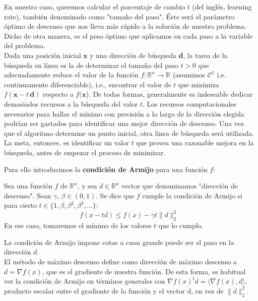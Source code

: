 En nuestro caso, queremos calcular el porcentaje de cambio $t$ (del inglés, learning rate), también denominado como "tamaño del paso". Éste será el parámetro óptimo de descenso que nos lleva más rápido a la solución de nuestro problema. Dicho de otra manera, es el peso óptimo que aplicamos en cada paso a la variable del problema.\\

Dada una posición inicial $\mathbf {x}$ y una dirección de búsqueda $\mathbf {d}$, la tarea de la búsqueda en línea es la de determinar el tamaño del paso $t >0$ que adecuadamente reduce el valor de la función $f:\mathbb {R} ^{n}\to \mathbb {R}$  (asumimos $\mathcal{C}^{1}$ i.e. continuamente diferenciable), i.e., encontrar el valor de $t$  que minimiza $f({\mathbf  {x}}-t \,{\mathbf  {d}})$ respecto a $f(\mathbf {x}$). De todas formas, generalmente es indeseable dedicar demasiados recursos a la búsqueda del valor $t$. Los recursos computacionales necesarios para hallar el mínimo con precisión a lo largo de la dirección elegida podrían ser gastados para identificar una mejor dirección de descenso. Una vez que el algoritmo determine un punto inicial, otra línea de búsqueda será utilizada. La meta, entonces, es identificar un valor $t$ que provea una razonable mejora en la búsqueda, antes de empezar el proceso de minimizar.

Para ello introducimos la \textbf{condición de Armijo} para una función $f$:
\begin{definition} \label{armijo}
	Sea una función $f$ de $\mathbb{R}^n$, y sea $d \in \mathbb{R}^n$ vector que denominamos "dirección de descenso". Sean $\gamma$, $\beta \in (0,1)$. Se dice que $f$ cumple la condición de Armijo si para cierto $t \in \{1,\beta, \beta^2, \beta^3, \dots\}$:
	\[f(x-t d) \leq f(x) - \gamma t \|d\|_2^2 \]
	En ese caso, tomaremos el mínimo de los valores $t$ que lo cumpla.
\end{definition}
 La condición de Armijo impone cotas a cuan grande puede ser el paso en la dirección $d$.\\
 
El método de máximo descenso define como dirección de máximo descenso a $d = \nabla f(x)$, que es el gradiente de nuestra función. De esta forma, es habitual ver la condición de Armijo en términos generales con $\nabla f(x)^t d = \langle \nabla f(x), d \rangle$, producto escalar entre el gradiente de la función y el vector d, en vez de $\|d\|_2^2$. \\

